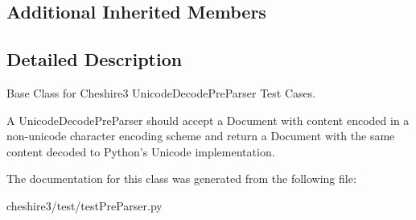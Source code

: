 \subsection*{Additional Inherited Members}


\subsection{Detailed Description}
\begin{DoxyVerb}Base Class for Cheshire3 UnicodeDecodePreParser Test Cases.

A UnicodeDecodePreParser should accept a Document with content encoded in a
non-unicode character encoding scheme and return a Document with the same 
content decoded to Python's Unicode implementation.
\end{DoxyVerb}
 

The documentation for this class was generated from the following file\-:\begin{DoxyCompactItemize}
\item 
cheshire3/test/test\-Pre\-Parser.\-py\end{DoxyCompactItemize}
